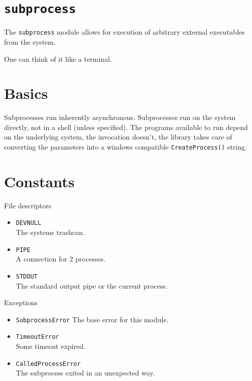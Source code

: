 \section{\texorpdfstring{\texttt{subprocess}}{subprocess}}\label{subprocess}

\begin{frame}

The \texttt{subprocess} module allows for execution of arbitrary
external executables from the system.

One can think of it like a terminal.

\end{frame}

\section{Basics}\label{basics}

\begin{frame}

Subprocesses run inherently asynchronous. Subprocesses run on the system
directly, not in a shell (unless specified). The programs available to
run depend on the underlying system, the invocation doesn't, the library
takes care of converting the parameters into a windows compatible
\texttt{CreateProcess()} string.

\end{frame}

\section{Constants}\label{constants}

\begin{frame}{File descriptors}

\begin{itemize}
\tightlist
\item
  \texttt{DEVNULL}\\
  The systems trashcan.
\item
  \texttt{PIPE}\\
  A connection for 2 processes.
\item
  \texttt{STDOUT}\\
  The standard output pipe or the current process.
\end{itemize}

\end{frame}

\begin{frame}{Exceptions}

\begin{itemize}
\tightlist
\item
  \texttt{SubprocessError} The base error for this module.
\item
  \texttt{TimeoutError}\\
  Some timeout expired.
\item
  \texttt{CalledProcessError}\\
  The subprocess exited in an unexpected way.
\end{itemize}

\end{frame}

